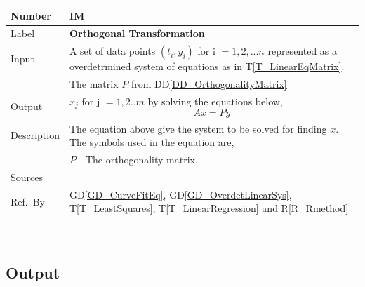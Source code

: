 \documentclass[12pt]{article}
\newcommand{\colAwidth}{0.13\textwidth}
\newcommand{\colBwidth}{0.82\textwidth}
\newcommand{\dref}[1]{GD\ref{#1}}
\newcommand{\ddref}[1]{DD\ref{#1}}
\newcommand{\tref}[1]{T\ref{#1}}
\newcounter{instnum} %
\newcommand{\rref}[1]{R\ref{#1}}
\begin{document}
\noindent
\begin{minipage}{\textwidth}
	\renewcommand*{\arraystretch}{1.5}
	\begin{tabular}{| p{\colAwidth} | p{\colBwidth}|}
		\hline
		\rowcolor[gray]{0.9}
		Number& IM{instnum}\theinstnum \label{IM_OrthogonalTransformation}\\
		\hline
		Label& \bf Orthogonal Transformation \\
		\hline
		
		Input
		& A set of data points $(t_i,y_i)$ for i $=1,2,...n$ represented as a overdetrmined system of equations as in \tref{T_LinearEqMatrix}.\\
		& The matrix $P$ from \ddref{DD_OrthogonalityMatrix}\\
		\hline
		
		Output
		& $x_j$ for j $=1,2..m$ by solving the equations below,
		\begin{equation*}
		Ax = Py
		\end{equation*}\\
		\hline
		
		Description & The equation above give the system to be solved for finding $x$. The symbols used in the equation are,\\
		& $P$ - The orthogonality matrix.\\
		\hline
	
		Sources& ~\cite{Health1997}\\
		\hline
		
		Ref.\ By &  \dref{GD_CurveFitEq}, \dref{GD_OverdetLinearSys}, \tref{T_LeastSquares}, \tref{T_LinearRegression} and \rref{R_Rmethod}\\
		\hline
	\end{tabular}
\end{minipage}\\








\subsection{Output} \label{sec_Output}    
\end{document}
